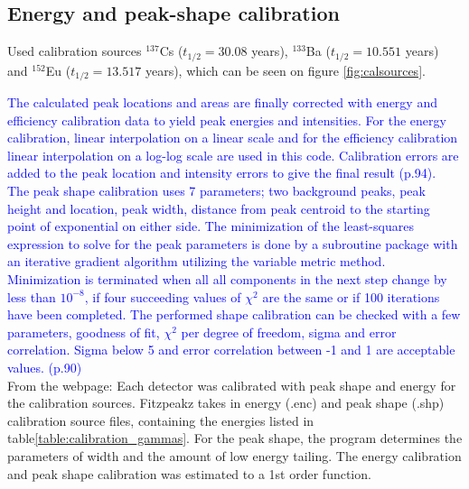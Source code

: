 \documentclass[a4paper,11pt,twoside]{book}
\begin{document}
\subsection{Energy and peak-shape calibration} \label{subsec:fitz_calibration}
Used calibration sources $^{137}$Cs ($t_{1/2}=30.08$ years\cite{Browne2007}), $^{133}$Ba ($t_{1/2}=10.551$ years\cite{Khazov2011}) and $^{152}$Eu ($t_{1/2}=13.517$ years\cite{Martin2013}), which can be seen on figure \ref{fig:calsources}.

\textcolor{blue}{The calculated peak locations and areas are finally corrected with energy and efficiency calibration data to yield peak energies and intensities. For the energy calibration, linear interpolation on a linear scale and for the efficiency calibration linear interpolation on a log-log scale are used in this code. Calibration errors are added to the peak location and intensity errors to give the final result (p.94). \\ The peak shape calibration uses 7 parameters; two background peaks, peak height and location, peak width, distance from peak centroid to the starting point of exponential on either side. The minimization of the least-squares expression to solve for the peak parameters is done by a subroutine package  with an iterative gradient algorithm utilizing the variable metric method. Minimization is terminated when all all components in the next step change by less than $10^{-8}$, if four succeeding values of $\chi^2$ are the same or if 100 iterations have been completed. The performed shape calibration can be checked with a few parameters, goodness of fit, $\chi^2$ per degree of freedom, sigma and error correlation. Sigma below 5 and error correlation between -1 and 1 are acceptable values.  (p.90)} \\


From the webpage:
Each detector was calibrated with peak shape and energy for the calibration sources. Fitzpeakz takes in energy (.enc) and peak shape (.shp) calibration source files, containing the energies listed in table\ref{table:calibration_gammas}. For the peak shape, the program determines the parameters of width and the amount of low energy tailing. The energy calibration and peak shape calibration was estimated to a 1st order function. 
\end{document}

